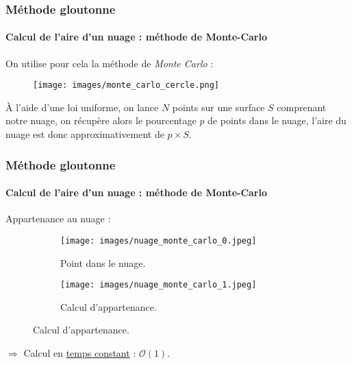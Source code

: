 \documentclass{beamer}
\begin{document}
\begin{frame}
	\frametitle{Méthode gloutonne}
	\framesubtitle{Calcul de l'aire d'un nuage : méthode de Monte-Carlo}
	On utilise pour cela la méthode de \emph{Monte Carlo} : \begin{figure}[h!]
		\centering 
		\texttt{[image: images/monte\_carlo\_cercle.png]}
	\end{figure}
	À l'aide d'une loi uniforme, on lance $N$ points sur une surface $S$ comprenant notre nuage, on récupère alors le pourcentage $p$ de points dans le nuage, l'aire du nuage est donc approximativement de $p \times S$. 
\end{frame}

\begin{frame}
	\frametitle{Méthode gloutonne}
	\framesubtitle{Calcul de l'aire d'un nuage : méthode de Monte-Carlo}
	Appartenance au nuage : 
	\begin{figure}[!htb]
		\centering
		\begin{subfigure}{0.4\textwidth}
			\centering
			\texttt{[image: images/nuage\_monte\_carlo\_0.jpeg]}
			\caption{Point dans le nuage.}
		\end{subfigure}
		\hspace*{\fill}
		\begin{subfigure}{0.4\textwidth}
			\centering 
			\texttt{[image: images/nuage\_monte\_carlo\_1.jpeg]}
			\caption{Calcul d'appartenance.}
		\end{subfigure}
	\end{figure}
	\begin{flushright}
		$\Rightarrow$ Calcul en \underline{temps constant} : $\mathcal{O}(1)$.
	\end{flushright}
\end{frame}
\end{document}
